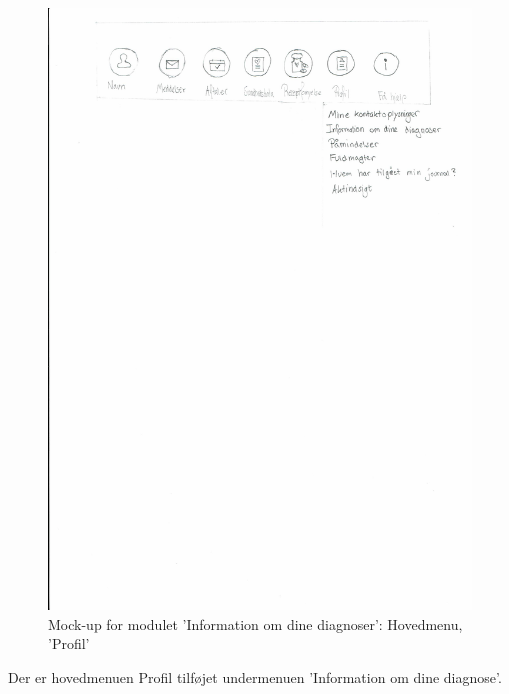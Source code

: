 \begin{figure}[H]
	\centering
	\includegraphics[angle=0, height=0.3\textheight]{Materials/Information_Hovedmenu.pdf}
	\caption{Mock-up for modulet 'Information om dine diagnoser': Hovedmenu, 'Profil'}
	\label{fig:Mock-Up}
\end{figure}
Der er hovedmenuen Profil tilføjet undermenuen 'Information om dine diagnose'.

